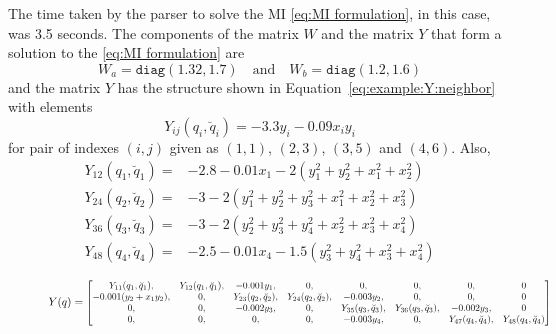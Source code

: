 \documentclass[10pt,twocolumn,twoside]{IEEEtran}
\theoremstyle{plain}
\theoremstyle{definition}
\theoremstyle{remark}
\begin{document}
The time taken by the parser to solve the MI \eqref{eq:MI formulation}, in this case, was 3.5 seconds. The components of the matrix $W$ and the matrix $Y$ that form a solution to the \eqref{eq:MI formulation} are
\begin{equation*}
		W_a=\mathbin{\mathtt{diag}}\left(
 1.32,1.7\right)\quad\text{and}\quad W_b=\mathbin{\mathtt{diag}}\left(1.2,1.6\right)
\end{equation*}
and the matrix $Y$ has the structure shown in Equation~\eqref{eq:example:Y:neighbor} with elements
\begin{equation*}
	Y_{ij}(q_i,\breve{q}_i)=-3.3y_i-0.09x_iy_i
\end{equation*}
for pair of indexes $(i,j)$ given as $(1,1)$, $(2,3)$, $(3,5)$ and $(4,6)$. Also, 
\begin{align*}
	Y_{12}(q_1,\breve{q}_1)=&-2.8-0.01x_1-2(y_1^2+y_2^2+x_1^2+x_2^2)\\	
	Y_{24}(q_2,\breve{q}_2)=&-3-2(y_1^2+y_2^2+y_3^2+x_1^2+x_2^2+x_3^2)\\	
	Y_{36}(q_3,\breve{q}_3)=&-3-2(y_2^2+y_3^2+y_4^2+x_2^2+x_3^2+x_4^2)\\	
	Y_{48}(q_4,\breve{q}_4)=&-2.5-0.01x_4-1.5(y_3^2+y_4^2+x_3^2+x_4^2)
\end{align*}

\begin{figure}
\begin{equation}\label{eq:example:Y:neighbor}
	Y(q)=\scalebox{0.85}{$\begin{bmatrix}
	Y_{11}(q_1,\breve{q}_1),&Y_{12}(q_1,\breve{q}_1),&-0.001y_1,&0,&0,&0,&0,&0\\
	-0.001(y_2+x_1y_2),&0,&Y_{23}(q_2,\breve{q}_2),&Y_{24}(q_2,\breve{q}_2),&-0.003y_2,&0,&0,&0\\
	0,&0,&-0.002y_3,&0,&Y_{35}(q_3,\breve{q}_3),&Y_{36}(q_3,\breve{q}_3),&-0.002y_3,&0\\
	0,&0,&0,&0,&-0.003y_4,&0,&Y_{47}(q_4,\breve{q}_4),&Y_{48}(q_4,\breve{q}_4)
	\end{bmatrix}$}
\end{equation}
\end{figure}
 
\end{document}
